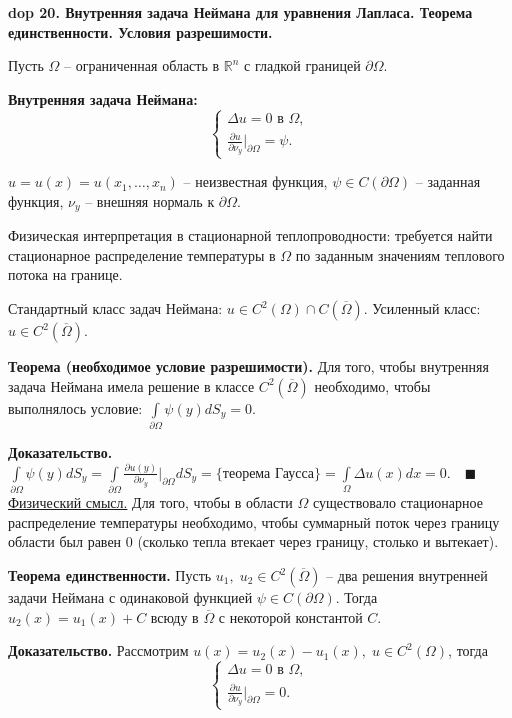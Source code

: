 \textbf{\LARGE dop 20. Внутренняя задача Неймана для уравнения Лапласа. Теорема единственности. Условия разрешимости.}

Пусть $\Omega$ -- ограниченная область в $\mathbb{R}^n$ с гладкой границей $\partial \Omega$.

\textbf{Внутренняя задача Неймана:}
\begin{equation*}
    \begin{cases}
    \Delta u = 0 \text{ в } \Omega, \\
    \frac{\partial u}{\partial \nu_y} \bigg |_{\partial \Omega} = \psi.
    \end{cases}
\end{equation*}

$u = u(x) = u(x_1, \ldots, x_n)$ -- неизвестная функция, $\psi \in C(\partial \Omega)$ -- заданная функция, $\nu_y$ -- внешняя нормаль к $\partial \Omega$.

Физическая интерпретация в стационарной теплопроводности: требуется найти стационарное распределение температуры в $\Omega$ по заданным значениям теплового потока на границе.

Стандартный класс задач Неймана: $u \in C^2(\Omega) \cap C(\overline{\Omega})$. Усиленный класс: $u \in C^2(\overline{\Omega})$.

\textbf{Теорема (необходимое условие разрешимости).} Для того, чтобы внутренняя задача Неймана имела решение в классе $C^2(\overline{\Omega})$ необходимо, чтобы выполнялось условие: $\int\limits_{\partial \Omega} \psi(y) dS_y = 0$.

\textbf{Доказательство.} $\int\limits_{\partial \Omega} \psi(y) dS_y = \int\limits_{\partial \Omega} \frac{\partial u(y)}{\partial \nu_y} \bigg |_{\partial \Omega} dS_y = \{\text{теорема Гаусса}\} = \int\limits_\Omega \Delta u(x) dx = 0.\quad \blacksquare$
\newline \newline
\underline{Физический смысл.} Для того, чтобы в области $\Omega$ существовало стационарное распределение температуры необходимо, чтобы суммарный поток через границу области был равен 0 (сколько тепла втекает через границу, столько и вытекает).

\textbf{Теорема единственности.} Пусть $u_1, \; u_2 \in C^2(\overline{\Omega})$ -- два решения внутренней задачи Неймана с одинаковой функцией $\psi \in C(\partial \Omega)$. Тогда $u_2(x) = u_1(x) + C$ всюду в $\overline{\Omega}$ с некоторой константой $C$.

\textbf{Доказательство.} Рассмотрим $u(x) = u_2(x) - u_1(x), \; u \in C^2(\Omega)$, тогда
\begin{equation*}
    \begin{cases}
    \Delta u = 0 \text{ в } \Omega, \\
    \frac{\partial u}{\partial \nu_y} \bigg |_{\partial \Omega} = 0.
    \end{cases}
\end{equation*}

